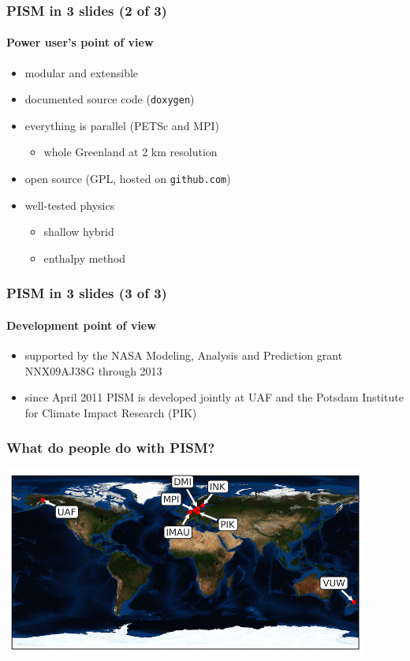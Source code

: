 \documentclass[hide notes,intlimits]{beamer}
\begin{document}
\begin{frame}
  \frametitle{PISM in 3 slides (2 of 3)}
  \framesubtitle{Power user's point of view}
  \begin{itemize}
  \item modular and extensible
  \item documented source code (\texttt{doxygen})
  \item everything is parallel (PETSc and MPI)
    \begin{itemize}
    \item whole Greenland at 2 km resolution
    \end{itemize}
  \item open source (GPL, hosted on \texttt{github.com})
  \item well-tested physics
    \begin{itemize}
    \item shallow hybrid
    \item enthalpy method
   \end{itemize}
  \end{itemize}
\end{frame}

\begin{frame}
  \frametitle{PISM in 3 slides (3 of 3)}
  \framesubtitle{Development point of view}
  \begin{itemize}
 \item supported by the NASA Modeling, Analysis and Prediction grant NNX09AJ38G
   through 2013
  \item since April 2011 PISM is developed jointly at UAF and the Potsdam
    Institute for Climate Impact Research (PIK)
  \end{itemize}
\end{frame}

\begin{frame}
  \frametitle{What do people do with PISM?}
 \begin{center}
    \includegraphics[width=120mm]{pism-users-map.png}
  \end{center}
\end{frame}
\end{document}
